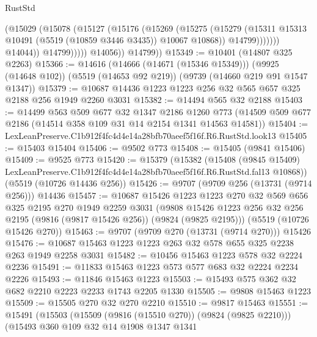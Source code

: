 \begin{lexlean}{RustStd}
\begin{coremodule}
                            (@15029
                              (@15078
                                (@15127
                                  (@15176
                                    (@15269
                                      (@15275
                                        (@15279
                                          (@15311
                                            @15313
                                            @10491
                                            (@5519 (@10859 @3446 @3435))
                                            @10067
                                            @10868))
                                        @14799)))))))
                          @14044))
                      @14799)))))
            @14056))
        @14799))
@15349 := @10401 (@14807 @325 @2263)
@15366 := @14616
    (@14666 (@14671 (@15346 @15349)))
    (@9925 (@14648 @102))
    (@5519 (@14653 @92 @219))
    (@9739 (@14660 @219 @91 @1547 @1347))
@15379 := @10687 @14436 @1223 @1223 @256 @32 @565 @657 @325 @2188 @256 @1949 @2260 @3031
@15382 := @14494 @565 @32 @2188
@15403 := @14499
    @563
    @509
    @677
    @32
    @1347
    @2186
    @1260
    @773
    (@14509 @509 @677 @2186 (@14514 @358 @109 @31 @14 @2154 @1341 @14563 @14581))
@15404 := LexLeanPreserve.C1b912f4fc4d4e14a28bfb70aeef5f16f.R6.RustStd.look13
@15405 := @15403 @15404
@15406 := @9502 @773
@15408 := @15405 (@9841 @15406)
@15409 := @9525 @773
@15420 := @15379
    (@15382
      (@15408
        (@9845 @15409)
        LexLeanPreserve.C1b912f4fc4d4e14a28bfb70aeef5f16f.R6.RustStd.fal13
        @10868))
    (@5519 (@10726 @14436 @256))
@15426 := @9707 (@9709 @256 (@13731 (@9714 @256))) @14436
@15457 := @10687
    @15426
    @1223
    @1223
    @270
    @32
    @569
    @656
    @325
    @2195
    @270
    @1949
    @2259
    @3031
    (@9808 @15426 @1223 @256 @32 @256 @2195 (@9816 (@9817 @15426 @256)) (@9824 (@9825 @2195)))
    (@5519 (@10726 @15426 @270))
@15463 := @9707 (@9709 @270 (@13731 (@9714 @270))) @15426
@15476 := @10687 @15463 @1223 @1223 @263 @32 @578 @655 @325 @2238 @263 @1949 @2258 @3031
@15482 := @10456 @15463 @1223 @578 @32 @2224 @2236
@15491 := @11833 @15463 @1223 @573 @577 @683 @32 @2224 @2234 @2226
@15493 := @11846 @15463 @1223
@15503 := @15493 @575 @362 @32 @682 @2210 @2223 @2233 @1743 @2205 @1330
@15505 := @9808 @15463 @1223
@15509 := @15505 @270 @32 @270 @2210
@15510 := @9817 @15463
@15551 := @15491
    (@15503
      (@15509 (@9816 (@15510 @270)) (@9824 (@9825 @2210)))
      (@15493
        @360
        @109
        @32
        @14
        @1908
        @1347
        @1341

\end{coremodule}
\end{lexlean}
